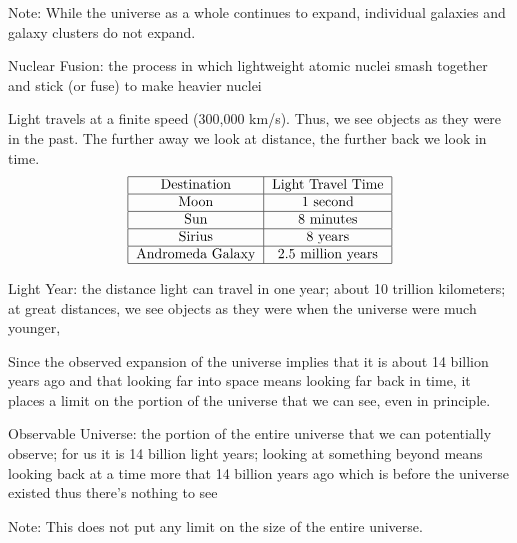 \documentclass[12pt]{article}
\begin{document}
Note: While the universe as a whole continues to expand, individual galaxies and galaxy clusters do not expand. 
\begin{definition} Nuclear Fusion: the process in which lightweight atomic nuclei smash together and stick (or fuse) to make heavier nuclei \end{definition} 
Light travels at a finite speed (300,000 km/s). Thus, we see objects as they were in the past. The further away we look at distance, the further back we look in time. 
$$ \begin{tabular}{|c|c|} \hline Destination & Light Travel Time \\ \hline
Moon & 1 second \\ \hline
Sun & 8 minutes \\ \hline
Sirius & 8 years \\ \hline
Andromeda Galaxy & 2.5 million years \\ \hline \end{tabular} $$
\begin{definition} Light Year: the distance light can travel in one year; about 10 trillion kilometers; at great distances, we see objects as they were when the universe were much younger,\end{definition} 
Since the observed expansion of the universe implies that it is about 14 billion years ago and that looking far into space means looking far back in time, it places a limit on the portion of the universe that we can see, even in principle. 
\begin{definition} Observable Universe: the portion of the entire universe that we can potentially observe; for us it is 14 billion light years; looking at something beyond means looking back at a time more that 14 billion years ago which is before the universe existed thus there's nothing to see \end{definition} 
Note: This does not put any limit on the size of the entire universe. 
\end{document}
